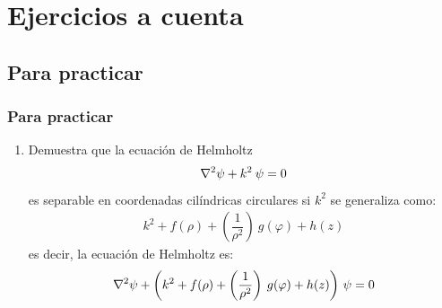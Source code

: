 \documentclass[12pt]{beamer}
\begin{document}
\section{Ejercicios a cuenta}
\subsection{Para practicar}

\begin{frame}
\frametitle{Para practicar}
\begin{enumerate}
\item Demuestra que la ecuación de Helmholtz
\begin{align*}
\laplacian \psi + k^{2} \: \psi = 0
\end{align*}
es separable en coordenadas cilíndricas circulares si $k^{2}$ se generaliza como:
\begin{align*}
k^{2} + f(\rho) + \left( \dfrac{1}{\rho^{2}} \right) \: g(\varphi) + h(z)
\end{align*}
es decir, la ecuación de Helmholtz es:
\begin{align*}
\laplacian \psi + \left( k^{2} + f(\rho) + \left( \dfrac{1}{\rho^{2}} \right) \: g(\varphi) + h(z) \right) \, \psi = 0
\end{align*}
\seti
\end{enumerate}
\end{frame}
\end{document}
